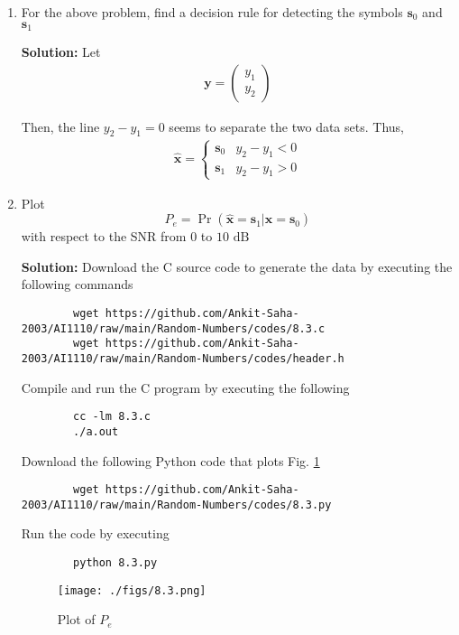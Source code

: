 \documentclass[journal,12pt,twocolumn]{IEEEtran}
\newcommand{\solution}{\noindent \textbf{Solution: }}
\providecommand{\pr}[1]{\ensuremath{\Pr\left(#1\right)}}
\providecommand{\mbf}{\mathbf}
\let\vec\mathbf
\numberwithin{equation}{section}
\renewcommand\thesection{\arabic{section}}
\newcommand{\myvec}[1]{\ensuremath{\begin{pmatrix}#1\end{pmatrix}}}
\begin{document}
\begin{enumerate}[label=\thesection.\arabic*,ref=\thesection.\theenumi]
	\item For the above problem, find a decision rule for detecting the symbols $\mbf{s}_0 $ and $\mbf{s}_1$
	
	\solution Let
	\begin{align}
		\vec{y} = \myvec{y_1 \\ y_2}
	\end{align}
	
	Then, the line $y_2 - y_1 = 0$ seems to separate the two data sets. Thus,
	\begin{align}
		\hat{\vec{x}} = 
		\begin{cases}
			\vec{s}_0 & y_2 - y_1 < 0 \\
			\vec{s}_1 & y_2 - y_1 > 0
		\end{cases}
	\end{align}
	
	\item Plot 
	\begin{equation} 
		P_e = \pr{\hat{\vec{x}} = \vec{s}_1|\vec{x} = \vec{s}_0}
	\end{equation}
	with respect to the SNR from $0$ to $10$ $\mathrm{dB}$
	
	\solution Download the C source code to generate the data by executing the following commands
	\begin{lstlisting}
		wget https://github.com/Ankit-Saha-2003/AI1110/raw/main/Random-Numbers/codes/8.3.c
		wget https://github.com/Ankit-Saha-2003/AI1110/raw/main/Random-Numbers/codes/header.h
	\end{lstlisting}
	Compile and run the C program by executing the following
	\begin{lstlisting}
		cc -lm 8.3.c
		./a.out
	\end{lstlisting}
	
	Download the following Python code that plots Fig. \ref{fig-8.3} 
	\begin{lstlisting}
		wget https://github.com/Ankit-Saha-2003/AI1110/raw/main/Random-Numbers/codes/8.3.py
	\end{lstlisting}
	Run the code by executing
	\begin{lstlisting}
		python 8.3.py
	\end{lstlisting}
	
	\begin{figure}
		\centering
		\texttt{[image: ./figs/8.3.png]}
		\caption{Plot of $P_e$}
		\label{fig-8.3}
	\end{figure}
	
	\end{enumerate}
\end{document}
